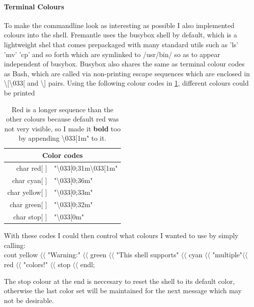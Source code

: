 \paragraph{Terminal Colours\\}{
To make the commandline look as interesting as possible I also implemented colours into the shell. Fremantle uses the busybox shell by default, which is a lightweight shel that comes prepackaged with many standard utils such as 'ls' 'mv' 'cp' and so forth which are symlinked to /usr/bin/ so as to appear independent of busybox.
Busybox also shares the same as terminal colour codes as Bash, which are called via non-printing escape sequences which are enclosed in \textbackslash[\textbackslash033[ and \textbackslash] pairs.
Using the following colour codes in \cref{tab:colorcodes}, different colours could be printed

\begin{table}[H]
\centering
\begin{tabular}{| r | l |}
\hline
\multicolumn{2}{|c|}{\bf Color codes} \\
\hline
char red[ ] &"\textbackslash033[0;31m\textbackslash033[1m"\\
char cyan[ ] &"\textbackslash033[0;36m"\\
char yellow[ ] &"\textbackslash033[0;33m"\\
char green[ ] &"\textbackslash033[0;32m"\\
char stop[ ] &"\textbackslash033[0m"\\
\hline
\end{tabular}
\caption{Red is a longer sequence than the other colours because default red was not very visible, so I made it {\bf bold} too by appending \textbackslash033[1m" to it.}
\label{tab:colorcodes}
\end{table}

With these codes I could then control what colours I wanted to use by simply calling:\\
cout  yellow \(\langle\langle\) "Warning:" \(\langle\langle\) green \(\langle\langle\) "This shell supports" \(\langle\langle\) cyan \(\langle\langle\) "multiple"\(\langle\langle\)  red \(\langle\langle\) "colors!" \(\langle\langle\) stop \(\langle\langle\) endl;

The stop colour at the end is neccesary to reset the shell to its default color, otherwise the last color set will be maintained for the next message which may not be desirable.

}
